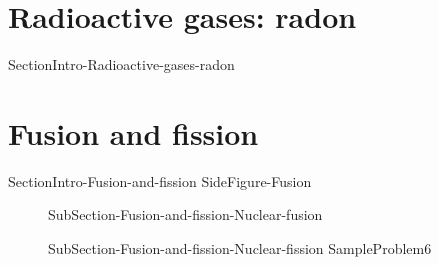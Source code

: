 \documentclass[main.tex]{subfiles}
\newcommand\chapterlabel{Ch-nuclear}\setcounter{figurenewcounter}{0}\setcounter{tablenewcounter}{0}\setcounter{formulanewcounter}{0}\chapterpicture{../{\chapterlabel}/figure1}\chapterpicturelabel{PxFuel}
\begin{document}
\section{Radioactive gases: radon}
{SectionIntro-Radioactive-gases-radon}


\section{Fusion and fission}{SectionIntro-Fusion-and-fission}
{SideFigure-Fusion}
\sloppy \begin{description}
\item[] {SubSection-Fusion-and-fission-Nuclear-fusion}
\item[] {SubSection-Fusion-and-fission-Nuclear-fission}
{SampleProblem6}
\end{description}




\clearpage\thispagestyle{empty}\mbox{}\clearpage
\end{document}
